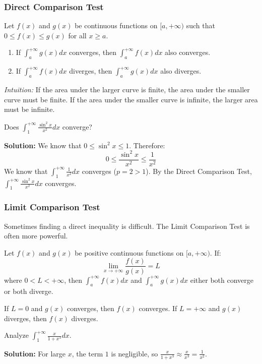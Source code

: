 \documentclass[oneside]{book}
\begin{document}
\subsubsection{Direct Comparison Test}
\begin{theorem}
Let $f(x)$ and $g(x)$ be continuous functions on $[a, +\infty)$ such that $0 \leq f(x) \leq g(x)$ for all $x \geq a$.
\begin{enumerate}
    \item If $\int_a^{+\infty} g(x) dx$ converges, then $\int_a^{+\infty} f(x) dx$ also converges.
    \item If $\int_a^{+\infty} f(x) dx$ diverges, then $\int_a^{+\infty} g(x) dx$ also diverges.
\end{enumerate}
\end{theorem}
\textit{Intuition:} If the area under the larger curve is finite, the area under the smaller curve must be finite. If the area under the smaller curve is infinite, the larger area must be infinite.
\begin{example}

Does $\int_1^{+\infty} \frac{\sin^2 x}{x^2} dx$ converge?
\end{example}
\textbf{Solution:} We know that $0 \leq \sin^2 x \leq 1$. Therefore:
\[
0 \leq \frac{\sin^2 x}{x^2} \leq \frac{1}{x^2}
\]
We know that $\int_1^{+\infty} \frac{1}{x^2} dx$ converges ($p=2 > 1$). By the Direct Comparison Test, $\int_1^{+\infty} \frac{\sin^2 x}{x^2} dx$ converges.
\subsubsection{Limit Comparison Test}

Sometimes finding a direct inequality is difficult. The Limit Comparison Test is often more powerful.

\begin{theorem}
Let $f(x)$ and $g(x)$ be positive continuous functions on $[a, +\infty)$. If:
\[
\lim_{x \to +\infty} \frac{f(x)}{g(x)} = L
\]
where $0 < L < +\infty$, then $\int_a^{+\infty} f(x) dx$ and $\int_a^{+\infty} g(x) dx$ either both converge or both diverge.
\end{theorem}
If $L=0$ and $g(x)$ converges, then $f(x)$ converges. If $L=+\infty$ and $g(x)$ diverges, then $f(x)$ diverges.
\begin{example}
Analyze $\int_1^{+\infty} \frac{x}{1+x^3} dx$.
\end{example}

\textbf{Solution:} For large $x$, the term $1$ is negligible, so $\frac{x}{1+x^3} \approx \frac{x}{x^3} = \frac{1}{x^2}$.
\end{document}
